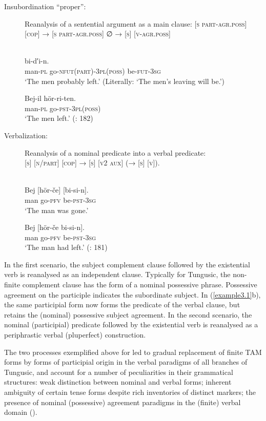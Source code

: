 \documentclass[output=paper,colorlinks,citecolor=brown]{langscibook}
\begin{document}
\begin{description}
\item[{\normalfont Insubordination “proper”:}] Reanalysis of a sentential argument as a main clause: \textsc{[s part-agr.poss] [cop] → [s part-agr.poss] ∅ → [s] [v-agr.poss]}

\ea
{}\\
\label{example3.1}
\ea
{}				bi-d′i-n.\\
     man-\textsc{pl} go-\textsc{nfut(part)}-\textsc{3pl(poss)}
     be-\textsc{fut}-\textsc{3sg}\\
\glt `The men probably left.’ (Literally: ‘The men’s leaving will be.’)

\ex
\gll Bej-il	hör-ri-ten.\\
     man-\textsc{pl} go-\textsc{pst}-\textsc{3pl(poss)}\\
\glt `The men left.’ (\citealt{Malchukov_2013}: 182)
\z
\z

\item[{\normalfont Verbalization:}] Reanalysis of a nominal predicate into a verbal predicate:\\
\textsc{[s] [n/part] [cop] → [s] [v2 aux] (→ [s] [v]}).


\ea
{}\\
\label{example3.2}
\ea
\gll Bej	[hör-če]	[bi-si-n].\\
     man
     go-\textsc{pfv}
     be-\textsc{pst}-\textsc{3sg}\\
\glt `The man was gone.’


\ex
\gll Bej	[hör-če	bi-si-n].\\
     man
     go-\textsc{pfv}
     be-\textsc{pst}-\textsc{3sg}\\
\glt `The man had left.’ (\citealt{Malchukov_2013}: 181)
\z
\z
\end{description}

In the first scenario, the subject complement clause followed by the existential verb is reanalysed as an independent clause. Typically for Tungusic, the non-finite complement clause has the form of a nominal possessive phrase. Possessive agreement on the participle indicates the subordinate subject. In (\ref{example3.1}b), the same participial form now forms the predicate of the verbal clause, but retains the (nominal) possessive subject agreement. In the second scenario, the nominal (participial) predicate followed by the existential verb is reanalysed as a periphrastic verbal (pluperfect) construction.

The two processes exemplified above for  led to gradual replacement of finite TAM forms by forms of participial origin in the verbal paradigms of all branches of Tungusic, and account for a number of peculiarities in their grammatical structures: weak distinction between nominal and verbal forms; inherent ambiguity of certain tense forms despite rich inventories of distinct markers; the presence of nominal (possessive) agreement paradigms in the (finite) verbal domain (\citealt{Malchukov_2013}).
\end{document}
